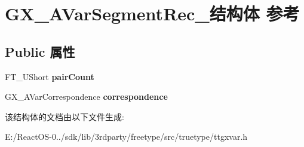 \hypertarget{struct_g_x___a_var_segment_rec__}{}\section{G\+X\+\_\+\+A\+Var\+Segment\+Rec\+\_\+结构体 参考}
\label{struct_g_x___a_var_segment_rec__}
\subsection*{Public 属性}
\begin{DoxyCompactItemize}
\item 
\mbox{\label{struct_g_x___a_var_segment_rec___a6294d18a885a0ee5d97a1681ca3a320a}} 
F\+T\+\_\+\+U\+Short {\bfseries pair\+Count}
\item 
\mbox{\label{struct_g_x___a_var_segment_rec___ac63832f9884f20e57d9e6952f403007d}} 
G\+X\+\_\+\+A\+Var\+Correspondence {\bfseries correspondence}
\end{DoxyCompactItemize}


该结构体的文档由以下文件生成\+:\begin{DoxyCompactItemize}
\item 
E\+:/\+React\+O\+S-\/0../sdk/lib/3rdparty/freetype/src/truetype/ttgxvar.\+h\end{DoxyCompactItemize}
